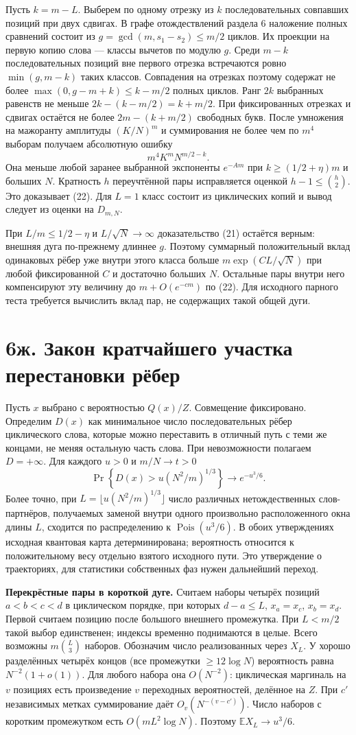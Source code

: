 \documentclass[11pt,a4paper]{article}
\newcommand{\sect}[1]{\section*{\sffamily\color{ink}#1}}
\newcommand{\subt}[1]{\par\medskip\noindent\textbf{#1.}\quad}
\begin{document}
Пусть $k=m-L$. Выберем по одному отрезку из $k$ последовательных совпавших позиций при двух сдвигах. В графе отождествлений раздела 6 наложение полных сравнений состоит из $g=\gcd(m,s_1-s_2)\le m/2$ циклов. Их проекции на первую копию слова --- классы вычетов по модулю $g$. Среди $m-k$ последовательных позиций вне первого отрезка встречаются ровно $\min(g,m-k)$ таких классов. Совпадения на отрезках поэтому содержат не более $\max(0,g-m+k)\le k-m/2$ полных циклов. Ранг $2k$ выбранных равенств не меньше $2k-(k-m/2)=k+m/2$. При фиксированных отрезках и сдвигах остаётся не более $2m-(k+m/2)$ свободных букв. После умножения на мажоранту амплитуды $(K/N)^m$ и суммирования не более чем по $m^4$ выборам получаем абсолютную ошибку
\[
                            m^4 K^m N^{m/2-k}.                              \tag{23}
\]
Она меньше любой заранее выбранной экспоненты $e^{-Am}$ при $k\ge (1/2+\eta)m$ и больших $N$. Кратность $h$ переучтённой пары исправляется оценкой $h-1\le\binom h2$. Это доказывает (22). Для $L=1$ класс состоит из циклических копий и вывод следует из оценки на $D_{m,N}$.

При $L/m\le 1/2-\eta$ и $L/\sqrt N\to\infty$ доказательство (21) остаётся верным: внешняя дуга по-прежнему длиннее $g$. Поэтому суммарный положительный вклад одинаковых рёбер уже внутри этого класса больше $m\exp(C L/\sqrt N)$ при любой фиксированной $C$ и достаточно больших $N$. Остальные пары внутри него компенсируют эту величину до $m+O(e^{-cm})$ по (22). Для исходного парного теста требуется вычислить вклад пар, не содержащих такой общей дуги.
\newpage
\sect{6ж. Закон кратчайшего участка перестановки рёбер}
Пусть $x$ выбрано с вероятностью $Q(x)/Z$. Совмещение фиксировано. Определим $D(x)$ как минимальное число последовательных рёбер циклического слова, которые можно переставить в отличный путь с теми же концами, не меняя остальную часть слова. При невозможности полагаем $D=+\infty$. Для каждого $u>0$ и $m/N\to t>0$
\[
  \boxed{\displaystyle
  \Pr\!\left\{D(x)>u(N^2/m)^{1/3}\right\}\longrightarrow e^{-u^3/6}.}       \tag{24}
\]
Более точно, при $L=\lfloor u(N^2/m)^{1/3}\rfloor$ число различных нетождественных слов-партнёров, получаемых заменой внутри одного произвольно расположенного окна длины $L$, сходится по распределению к $\operatorname{Pois}(u^3/6)$. В обоих утверждениях исходная квантовая карта детерминирована; вероятность относится к положительному весу отдельно взятого исходного пути. Это утверждение о траекториях, для статистики собственных фаз нужен дальнейший переход.

\subt{Перекрёстные пары в короткой дуге} Считаем наборы четырёх позиций $a<b<c<d$ в циклическом порядке, при которых $d-a\le L$, $x_a=x_c$, $x_b=x_d$. Первой считаем позицию после большого внешнего промежутка. При $L<m/2$ такой выбор единственен; индексы временно поднимаются в целые. Всего возможны $m\binom L3$ наборов. Обозначим число реализованных через $X_L$. У хорошо разделённых четырёх концов (все промежутки $\ge12\log N$) вероятность равна $N^{-2}(1+o(1))$. Для любого набора она $O(N^{-2})$: циклическая маргиналь на $v$ позициях есть произведение $v$ переходных вероятностей, делённое на $Z$. При $c'$ независимых метках суммирование даёт $O_v(N^{-(v-c')})$. Число наборов с коротким промежутком есть $O(m L^2\log N)$. Поэтому $\mathbb E X_L\to u^3/6$.
\end{document}
